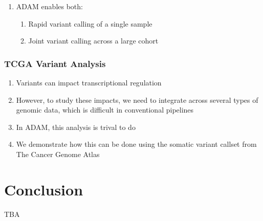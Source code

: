 \documentclass{nature}
\begin{document}
\begin{refsegment}
\begin{enumerate}
\item ADAM enables both:
\begin{enumerate}
\item Rapid variant calling of a single sample
\item Joint variant calling across a large cohort
\end{enumerate}
\end{enumerate}

\subsubsection{TCGA Variant Analysis}
\label{sec:tcga-variant-analysis}

\begin{enumerate}
\item Variants can impact transcriptional regulation~\cite{weingarten14, levo14}
\item However, to study these impacts, we need to integrate across several
types of genomic data, which is difficult in conventional pipelines
\item In ADAM, this analysis is trival to do
\item We demonstrate how this can be done using the somatic variant callset from
The Cancer Genome Atlas~\cite{weinstein13}
\end{enumerate}

\section{Conclusion}
\label{sec:conclusion}

TBA

\printbibliography[segment=1]
\end{refsegment}
\end{document}
